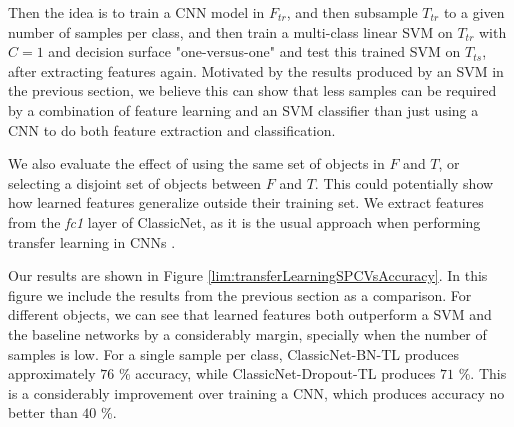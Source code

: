 Then the idea is to train a CNN model in $F_{tr}$, and then subsample $T_{tr}$ to a given number of samples per class, and then train a multi-class linear SVM on $T_{tr}$ with $C = 1$ and decision surface "one-versus-one" and test this trained SVM on $T_{ts}$, after extracting features again. Motivated by the results produced by an SVM in the previous section, we believe this can show that less samples can be required by a combination of feature learning and an SVM classifier than just using a CNN to do both feature extraction and classification.

We also evaluate the effect of using the same set of objects in $F$ and $T$, or selecting a disjoint set of objects between $F$ and $T$. This could potentially show how learned features generalize outside their training set. We extract features from the \textit{fc1} layer of ClassicNet, as it is the usual approach when performing transfer learning in CNNs \cite{sharif2014cnn}.

Our results are shown in Figure \ref{lim:transferLearningSPCVsAccuracy}. In this figure we include the results from the previous section as a comparison. For different objects, we can see that learned features both outperform a SVM and the baseline networks by a considerably margin, specially when the number of samples is low. For a single sample per class, ClassicNet-BN-TL produces approximately $76$ \% accuracy, while ClassicNet-Dropout-TL produces $71$ \%. This is a considerably improvement over training a CNN, which produces accuracy no better than $40$ \%.

